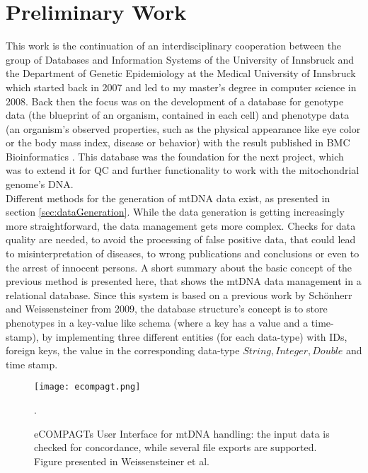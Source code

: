 \section{Preliminary Work}
\label{prelimWork}
This work is the continuation of an interdisciplinary cooperation between the group of Databases and Information Systems of the University of Innsbruck and the Department of Genetic Epidemiology at the Medical University of Innsbruck which started back in 2007 and led to my master's degree in computer science in 2008. Back then the focus was on the development of a database for genotype data (the blueprint of an organism, contained in each cell) and phenotype data (an organism's observed properties, such as the physical appearance like eye color or the body mass index, disease or behavior) with the result published in BMC Bioinformatics \cite{Schoenherr2009}. This database was the foundation for the next project, which was to extend it for QC and further functionality to work with the mitochondrial genome's DNA. 
\\
Different methods for the generation of mtDNA data exist, as presented in section \ref{sec:dataGeneration}. While the data generation is getting increasingly more straightforward, the data management gets more complex. Checks for data quality are needed, to avoid the processing of false positive data, that could lead to misinterpretation of diseases, to wrong publications and conclusions or even to the arrest of innocent persons.
A short summary about the basic concept of the previous method is presented here, that shows the mtDNA data management in a relational database. Since this system is based on a previous work by Sch\"onherr and Weissensteiner \cite{Schoenherr2009} from 2009, the database structure's concept is to store phenotypes in a key-value like schema (where a key has a value and a time-stamp), by implementing three different entities (for each data-type)  with IDs, foreign keys, the value in the corresponding data-type $String, Integer, Double$ and time stamp.
\begin{figure}[ht]
\begin{center}
\texttt{[image: ecompagt.png]}
\caption[eCOMPAGTs User Interface]{eCOMPAGTs User Interface for mtDNA handling: the input data is checked for concordance, while several file exports are supported. Figure presented in Weissensteiner et al. \cite{Weissensteiner2010}}.
\label{fig:ecompagt}
\end{center}
\end{figure}
